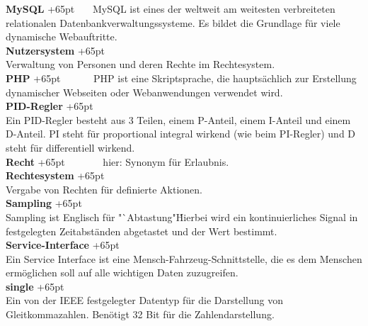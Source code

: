 \documentclass[fontsize = 12pt, paper = a4]{scrreprt}
\begin{document}
\textbf{MySQL}
\hangindent+65pt  
\ \ \  MySQL ist eines der weltweit am weitesten verbreiteten relationalen Datenbankverwaltungssysteme. Es bildet die Grundlage für viele dynamische Webauftritte.\\

\textbf{Nutzersystem}
\hangindent+65pt  \\
Verwaltung von Personen und deren Rechte im Rechtesystem.\\



\textbf{PHP}
\hangindent+65pt 
\ \ \ \ \ \ PHP ist eine Skriptsprache, die hauptsächlich zur Erstellung dynamischer Webseiten oder Webanwendungen verwendet wird.\\

\textbf{PID-Regler}
\hangindent+65pt  \\
Ein PID-Regler besteht aus 3 Teilen, einem P-Anteil, einem I-Anteil und einem D-Anteil. PI steht für proportional integral wirkend (wie beim PI-Regler) und D steht für differentiell wirkend.\\

\textbf{Recht}
\hangindent+65pt  
\ \ \ \ \ \ \ hier: Synonym für Erlaubnis.\\

\textbf{Rechtesystem}
\hangindent+65pt  \\
Vergabe von Rechten für definierte Aktionen.\\

\textbf{Sampling}
\hangindent+65pt  \\
Sampling ist Englisch für "`Abtastung"\. Hierbei wird ein kontinuierliches Signal in festgelegten Zeitabständen abgetastet und der Wert bestimmt.\\

\textbf{Service-Interface}
\hangindent+65pt  \\
Ein Service Interface ist eine Mensch-Fahrzeug-Schnittstelle, die es dem Menschen ermöglichen soll auf alle wichtigen Daten zuzugreifen.\\

\textbf{single}
\hangindent+65pt  \\
Ein von der IEEE festgelegter Datentyp für die Darstellung von Gleitkommazahlen. Benötigt 32 Bit für die Zahlendarstellung.\\
\end{document}
